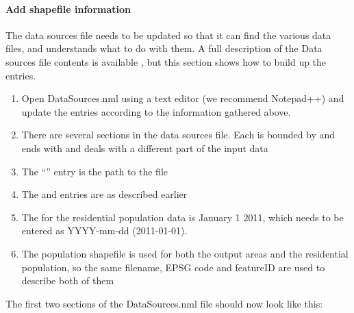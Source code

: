 \documentclass[letterpaper,10pt,english]{sphinxmanual}
\begin{document}
\paragraph{Add shapefile information}
\label{\detokenize{Tutorials/LQF:add-shapefile-information}}
The data sources file needs to be updated so that it can find the
various data files, and understands what to do with them. A full
description of the Data sources file contents is available
, but this section shows how to
build up the entries.
\begin{enumerate}
\item {} 
Open DataSources.nml using a text editor (we recommend Notepad++) and
update the entries according to the information gathered above.

\item {} 
There are several sections in the data sources file. Each is bounded
by  and ends with  and deals with a
different part of the input data

\item {} 
The “” entry is the path to the file

\item {} 
The  and  entries are as described earlier

\item {} 
The  for the residential population data is January 1
2011, which needs to be entered as YYYY-mm-dd (2011-01-01).

\item {} 
The population shapefile is used for both the output areas and the
residential population, so the same filename, EPSG code and featureID
are used to describe both of them

\end{enumerate}

The first two sections of the DataSources.nml file should now look like
this:

%
\begin{sphinxVerbatim}[commandchars=\\\{\}]
     
     
     
     
     
     
     
\end{sphinxVerbatim}
\end{document}

